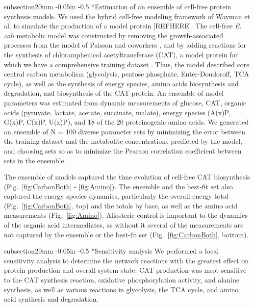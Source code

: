 \documentclass[12pt]{article}
\makeatletter
\renewcommand\subsection{\@startsection
	{subsection}{2}{0mm}
	{-0.05in}
	{-0.5\baselineskip}
	{\normalfont\normalsize\bfseries}}
\makeatother
\begin{document}
\subsection*{Estimation of an ensemble of cell-free protein synthesis models.}
We used the hybrid cell-free modeling framework of Wayman et al. to simulate the production of a model protein [REFHERE].
The cell-free \textit{E. coli} metabolic model was constructed by removing the growth-associated processes from the model of Palsson and coworkers \cite{2000_edwards_palsson_PNAS}, and by adding reactions for the synthesis of chloramphenicol acetyltransferase (CAT), a model protein for which we have a comprehensive training dataset \cite{2005_calhoun_BiotechnologyProgress}.
Thus, the model described core central carbon metabolism (glycolysis, pentose phosphate, Enter-Doudoroff, TCA cycle),
as well as the synthesis of energy species, amino acids biosynthesis and degradation, and biosynthesis of the CAT protein.
An ensemble of model parameters was estimated from dynamic measurements of glucose, CAT, organic acids (pyruvate, lactate, acetate, succinate, malate), energy species (A(x)P, G(x)P, C(x)P, U(x)P), and 18 of the 20 proteinogenic amino acids.
We generated an ensemble of N = 100 diverse parameter sets by minimizing the error between the training dataset and the metabolite concentrations predicted by the model, and choosing sets so as to minimize the Pearson correlation coefficient between sets in the ensemble.

The ensemble of models captured the time evolution of cell-free CAT biosynthesis (Fig.~\ref{fig:CarbonBoth} - \ref{fig:Amino}).
The ensemble and the best-fit set also captured the energy species dynamics, particularly the overall energy total (Fig.~\ref{fig:CarbonBoth}, top) and the totals by base, as well as the amino acid measurements (Fig.~\ref{fig:Amino}).
Allosteric control is important to the dynamics of the organic acid intermediates, as without it several of the measurements are not captured by the ensemble or the best-fit set (Fig.~\ref{fig:CarbonBoth}, bottom).

\subsection*{Sensitivity analysis}
We performed a local sensitivity analysis to determine the network reactions with the greatest effect on protein production and overall system state.
CAT production was msot sensitive to the CAT synthesis reaction, oxidative phosphorylation activity, and alanine synthesis, as well as various reactions in glycolysis, the TCA cycle, and amino acid synthesis and degradation.
    
\end{document}
